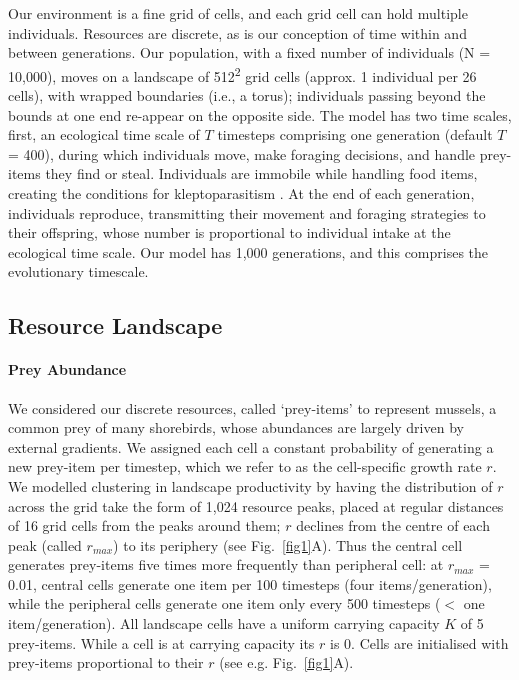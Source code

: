 Our environment is a fine grid of cells, and each grid cell can hold multiple individuals.
Resources are discrete, as is our conception of time within and between generations. 
Our population, with a fixed number of individuals (N = 10,000), moves on a landscape of 512\textsuperscript{2} grid cells (approx. 1 individual per 26 cells), with wrapped boundaries (i.e., a torus); individuals passing beyond the bounds at one end re-appear on the opposite side.
The model has two time scales, first, an ecological time scale of $T$ timesteps comprising one generation (default $T$ = 400), during which individuals move, make foraging decisions, and handle prey-items they find or steal.
Individuals are immobile while handling food items, creating the conditions for kleptoparasitism \citep{brockmann1979,ruxton1992}.
At the end of each generation, individuals reproduce, transmitting their movement and foraging strategies to their offspring, whose number is proportional to individual intake at the ecological time scale.
Our model has 1,000 generations, and this comprises the evolutionary timescale.

\subsection*{Resource Landscape}

\paragraph{Prey Abundance}

We considered our discrete resources, called `prey-items' to represent mussels, a common prey of many shorebirds, whose abundances are largely driven by external gradients.
We assigned each cell a constant probability of generating a new prey-item per timestep, which we refer to as the cell-specific growth rate $r$.
We modelled clustering in landscape productivity by having the distribution of $r$ across the grid take the form of 1,024 resource peaks, placed at regular distances of 16 grid cells from the peaks around them; $r$ declines from the centre of each peak (called $r_{max}$) to its periphery (see Fig.~\ref{fig1}A).
Thus the central cell generates prey-items five times more frequently than peripheral cell: at $r_{max}$ = 0.01, central cells generate one item per 100 timesteps (four items/generation), while the peripheral cells generate one item only every 500 timesteps ($<$ one item/generation).
All landscape cells have a uniform carrying capacity $K$ of 5 prey-items.
While a cell is at carrying capacity its $r$ is 0.
Cells are initialised with prey-items proportional to their $r$ (see e.g. Fig.~\ref{fig1}A).

